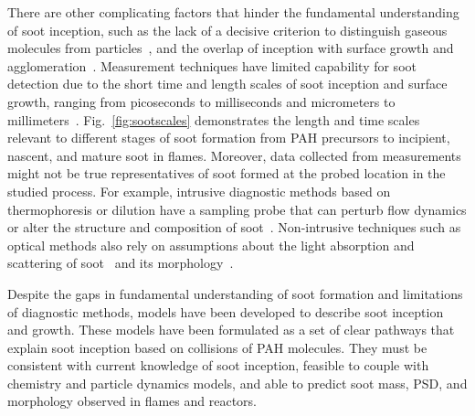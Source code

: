 There are other complicating factors that hinder the fundamental understanding of soot inception, such as the lack of a decisive criterion to distinguish gaseous molecules from particles~\citep{d2009combustion}, and the overlap of inception with surface growth and agglomeration~\citep{martin2022soot}. Measurement techniques have limited capability for soot detection due to the short time and length scales of soot inception and surface growth, ranging from picoseconds to milliseconds and micrometers to millimeters~\citep{violi2005relative}. Fig.~\ref{fig:sootscales} demonstrates the length and time scales relevant to different stages of soot formation from PAH precursors to incipient, nascent, and mature soot in flames. Moreover, data collected from measurements might not be true representatives of soot formed at the probed location in the studied process. For example, intrusive diagnostic methods based on thermophoresis or dilution have a sampling probe that can perturb flow dynamics or alter the structure and composition of soot~\citep{kholghy2017comparison}. Non-intrusive techniques such as optical methods also rely on assumptions about the light absorption and scattering of soot~\citep{shaddix1996laser} and its morphology~\citep{doner2017impact}.


Despite the gaps in fundamental understanding of soot formation and limitations of diagnostic methods, models have been developed to describe soot inception and growth. These models have been formulated as a set of clear pathways that explain soot inception based on collisions of PAH molecules. They must be consistent with current knowledge of soot inception, feasible to couple with chemistry and particle dynamics models, and able to predict soot mass, PSD, and morphology observed in flames and reactors.

